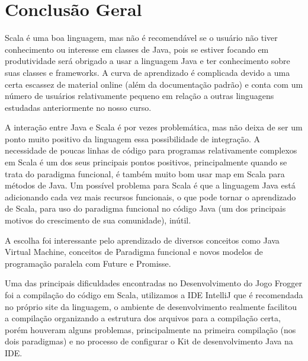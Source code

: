 \documentclass[rel-mlp]{iiufrgs}
\begin{document}
\chapter{Conclusão Geral}

Scala é uma boa linguagem, mas não é recomendável se o usuário não tiver conhecimento ou interesse em classes de Java, pois se estiver focando em produtividade será obrigado a usar a linguagem Java e ter conhecimento sobre suas classes e frameworks. A curva de aprendizado é complicada devido a uma certa escassez de material online (além da documentação padrão) e conta com um número de usuários relativamente pequeno em relação a outras linguagens estudadas anteriormente no nosso curso.

A interação entre Java e Scala é por vezes problemática, mas não deixa de ser um ponto muito positivo da linguagem essa possibilidade de integração. A necessidade de poucas linhas de código para programas relativamente complexos em Scala é um dos seus principais pontos positivos, principalmente quando se trata do paradigma funcional, é também muito bom usar map em Scala para métodos de Java. Um possível problema para Scala é que a linguagem Java está adicionando cada vez mais recursos funcionais, o que pode tornar o aprendizado de Scala, para uso do paradigma funcional no código Java (um dos principais motivos do crescimento de sua comunidade), inútil. 

A escolha foi interessante pelo aprendizado de diversos conceitos como Java Virtual Machine, conceitos de Paradigma funcional e novos modelos de programação paralela com Future e Promisse.

Uma das principais dificuldades encontradas no Desenvolvimento do Jogo Frogger foi a compilação do código em Scala, utilizamos a IDE IntelliJ que é recomendada no próprio site da linguagem, o ambiente de desenvolvimento realmente facilitou a compilação organizando a estrutura dos arquivos para a compilação certa, porém houveram alguns problemas, principalmente na primeira compilação (nos dois paradigmas) e no processo de configurar o Kit de desenvolvimento Java na IDE\cite{intellij}.


%



\end{document}
